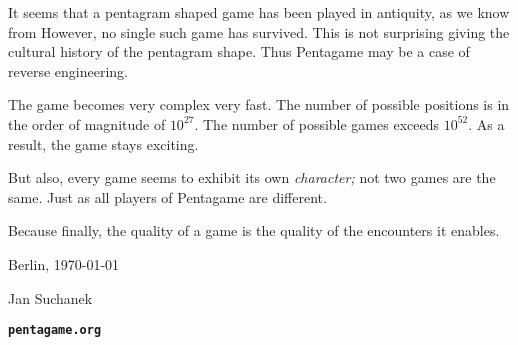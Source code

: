 
\centering



\justify


It seems that a pentagram shaped game has been played in antiquity, as we know from  
However, no single such game has survived. 
This is not surprising giving the cultural history of the pentagram shape. 
Thus Pentagame may be a case of reverse engineering.

The game becomes very complex very fast. The number of possible positions is in the order of magnitude of $10^{27}$. The number of possible games exceeds $10^{52}$.  As a result, the game stays exciting.

But also, every game seems to exhibit its own \emph{character; }not two games are the same. 
Just as all players of Pentagame are different.

Because finally, the quality of a game is the quality of the encounters it enables.

\medskip

Berlin, \today 

\flushright

\hfill Jan Suchanek


\vfill

 {\Large\texttt{\textbf{pentagame.org}}}
 
